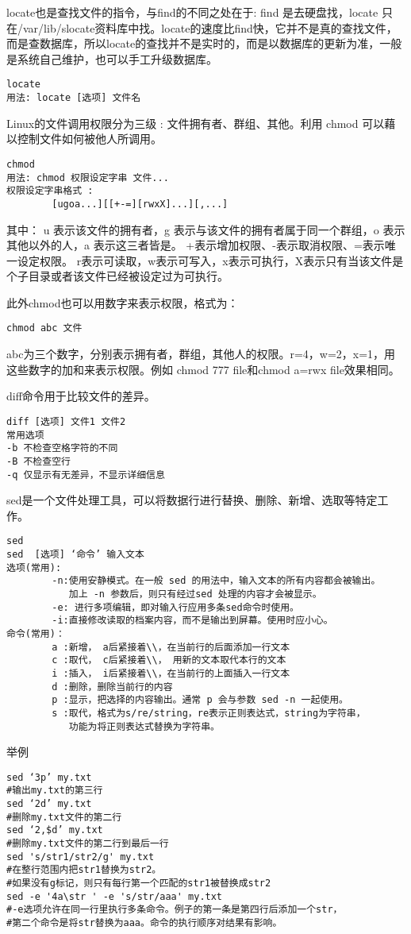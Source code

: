  locate也是查找文件的指令，与find的不同之处在于: find 是去硬盘找，locate 只在/var/lib/slocate资料库中找。locate的速度比find快，它并不是真的查找文件，而是查数据库，所以locate的查找并不是实时的，而是以数据库的更新为准，一般是系统自己维护，也可以手工升级数据库。
\begin{verbatim}
locate
用法: locate [选项] 文件名
\end{verbatim}

  Linux的文件调用权限分为三级 : 文件拥有者、群组、其他。利用 chmod 可以藉以控制文件如何被他人所调用。
\begin{verbatim}
chmod
用法: chmod 权限设定字串 文件...
权限设定字串格式 :
        [ugoa...][[+-=][rwxX]...][,...]
\end{verbatim}

其中：
u 表示该文件的拥有者，g 表示与该文件的拥有者属于同一个群组，o 表示其他以外的人，a 表示这三者皆是。
+表示增加权限、-表示取消权限、=表示唯一设定权限。
r表示可读取，w表示可写入，x表示可执行，X表示只有当该文件是个子目录或者该文件已经被设定过为可执行。

此外chmod也可以用数字来表示权限，格式为：
\begin{verbatim}
chmod abc 文件
\end{verbatim}
abc为三个数字，分别表示拥有者，群组，其他人的权限。r=4，w=2，x=1，用这些数字的加和来表示权限。例如
chmod 777 file和chmod a=rwx file效果相同。

diff命令用于比较文件的差异。
\begin{verbatim}
diff [选项] 文件1 文件2
常用选项
-b 不检查空格字符的不同
-B 不检查空行
-q 仅显示有无差异，不显示详细信息
\end{verbatim}

sed是一个文件处理工具，可以将数据行进行替换、删除、新增、选取等特定工作。
\begin{verbatim}
sed
sed  [选项] ‘命令’ 输入文本
选项(常用):
        -n:使用安静模式。在一般 sed 的用法中，输入文本的所有内容都会被输出。
           加上 -n 参数后，则只有经过sed 处理的内容才会被显示。
        -e: 进行多项编辑，即对输入行应用多条sed命令时使用。
        -i:直接修改读取的档案内容，而不是输出到屏幕。使用时应小心。
命令(常用)：
        a :新增， a后紧接着\\，在当前行的后面添加一行文本
        c :取代， c后紧接着\\， 用新的文本取代本行的文本
        i :插入， i后紧接着\\，在当前行的上面插入一行文本
        d :删除，删除当前行的内容
        p :显示，把选择的内容输出。通常 p 会与参数 sed -n 一起使用。
        s :取代，格式为s/re/string，re表示正则表达式，string为字符串，
           功能为将正则表达式替换为字符串。
\end{verbatim}
举例
\begin{verbatim}
sed ‘3p’ my.txt
#输出my.txt的第三行
sed ‘2d’ my.txt
#删除my.txt文件的第二行
sed ‘2,$d’ my.txt
#删除my.txt文件的第二行到最后一行
sed 's/str1/str2/g' my.txt
#在整行范围内把str1替换为str2。
#如果没有g标记，则只有每行第一个匹配的str1被替换成str2
sed -e '4a\str ' -e 's/str/aaa' my.txt
#-e选项允许在同一行里执行多条命令。例子的第一条是第四行后添加一个str，
#第二个命令是将str替换为aaa。命令的执行顺序对结果有影响。
\end{verbatim}

